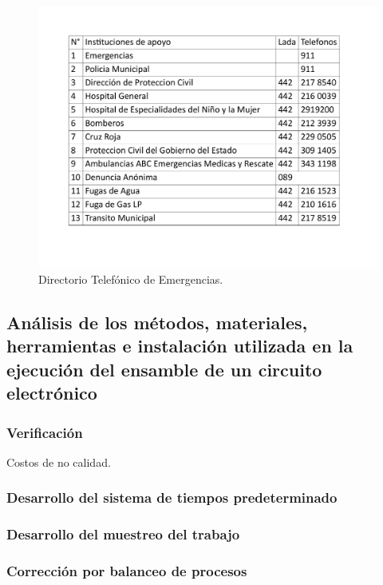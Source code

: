     \begin{figure}[H]
        \centering
        \includegraphics[scale=0.3]{21/img/directorioEmergecias.pdf}
        \caption{Directorio Telefónico de Emergencias.}
        \label{fig:directorioEmergencias}
    \end{figure}
    
    \subsection{Análisis de los métodos, materiales, herramientas e instalación utilizada en la ejecución del ensamble de un circuito electrónico}
    
    \subsubsection{Verificación}
    
    Costos de no calidad.
    \subsubsection{Desarrollo del sistema de tiempos predeterminado}
    \subsubsection{Desarrollo del muestreo del trabajo}
    \subsubsection{Corrección por balanceo de procesos}
